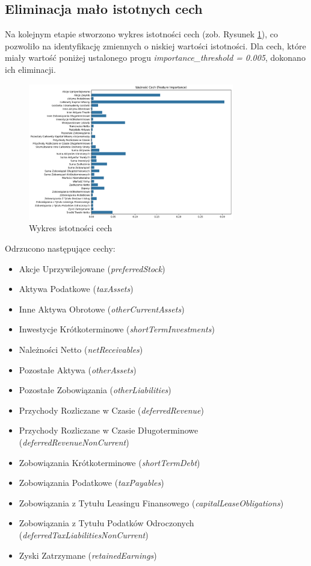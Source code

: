 \documentclass[12pt]{article}
\begin{document}
\subsection{Eliminacja mało istotnych cech}

Na kolejnym etapie stworzono wykres istotności cech (zob. Rysunek \ref{fig:feature_importance}), co pozwoliło na identyfikację zmiennych o niskiej wartości istotności. Dla cech, które miały wartość poniżej ustalonego progu \emph{importance\_threshold = 0.005}, dokonano ich eliminacji.

\begin{figure}[h]
    \centering
    \includegraphics[width=0.8\textwidth]{docs/img/feature-importances.png}
    \caption{Wykres istotności cech}
    \label{fig:feature_importance}
\end{figure}

Odrzucono następujące cechy:
\begin{itemize}
    \item Akcje Uprzywilejowane (\emph{preferredStock})
    \item Aktywa Podatkowe (\emph{taxAssets})
    \item Inne Aktywa Obrotowe (\emph{otherCurrentAssets})
    \item Inwestycje Krótkoterminowe (\emph{shortTermInvestments})
    \item Należności Netto (\emph{netReceivables})
    \item Pozostałe Aktywa (\emph{otherAssets})
    \item Pozostałe Zobowiązania (\emph{otherLiabilities})
    \item Przychody Rozliczane w Czasie (\emph{deferredRevenue})
    \item Przychody Rozliczane w Czasie Długoterminowe (\emph{deferredRevenueNonCurrent})
    \item Zobowiązania Krótkoterminowe (\emph{shortTermDebt})
    \item Zobowiązania Podatkowe (\emph{taxPayables})
    \item Zobowiązania z Tytułu Leasingu Finansowego (\emph{capitalLeaseObligations})
    \item Zobowiązania z Tytułu Podatków Odroczonych (\emph{deferredTaxLiabilitiesNonCurrent})
    \item Zyski Zatrzymane (\emph{retainedEarnings})
\end{itemize}
\end{document}

